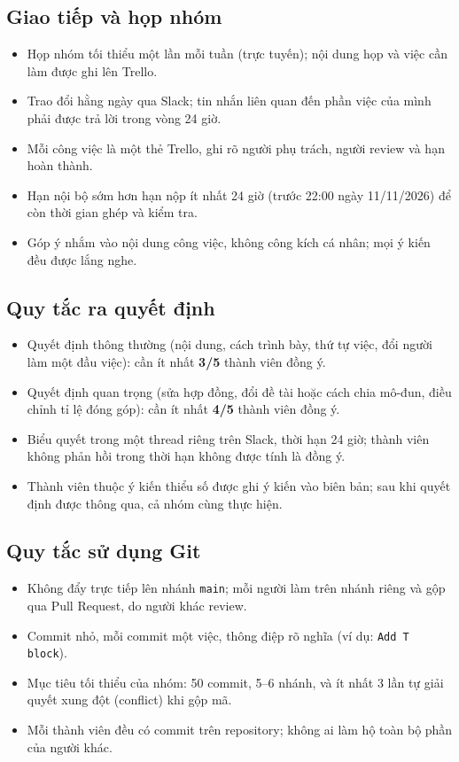 \documentclass[a4paper]{article}
\begin{document}
\subsection{Giao tiếp và họp nhóm}
\begin{itemize}
  \item Họp nhóm tối thiểu một lần mỗi tuần (trực tuyến); nội dung họp và việc cần làm được ghi lên Trello.
  \item Trao đổi hằng ngày qua Slack; tin nhắn liên quan đến phần việc của mình phải được trả lời trong vòng 24 giờ.
  \item Mỗi công việc là một thẻ Trello, ghi rõ người phụ trách, người review và hạn hoàn thành.
  \item Hạn nội bộ sớm hơn hạn nộp ít nhất 24 giờ (trước 22:00 ngày 11/11/2026) để còn thời gian ghép và kiểm tra.
  \item Góp ý nhắm vào nội dung công việc, không công kích cá nhân; mọi ý kiến đều được lắng nghe.
\end{itemize}

\subsection{Quy tắc ra quyết định}
\begin{itemize}
  \item Quyết định thông thường (nội dung, cách trình bày, thứ tự việc, đổi người làm một đầu việc): cần ít nhất \textbf{3/5} thành viên đồng ý.
  \item Quyết định quan trọng (sửa hợp đồng, đổi đề tài hoặc cách chia mô-đun, điều chỉnh tỉ lệ đóng góp): cần ít nhất \textbf{4/5} thành viên đồng ý.
  \item Biểu quyết trong một thread riêng trên Slack, thời hạn 24 giờ; thành viên không phản hồi trong thời hạn không được tính là đồng ý.
  \item Thành viên thuộc ý kiến thiểu số được ghi ý kiến vào biên bản; sau khi quyết định được thông qua, cả nhóm cùng thực hiện.
\end{itemize}

\subsection{Quy tắc sử dụng Git}
\begin{itemize}
  \item Không đẩy trực tiếp lên nhánh \texttt{main}; mỗi người làm trên nhánh riêng và gộp qua Pull Request, do người khác review.
  \item Commit nhỏ, mỗi commit một việc, thông điệp rõ nghĩa (ví dụ: \texttt{Add T block}).
  \item Mục tiêu tối thiểu của nhóm: 50 commit, 5--6 nhánh, và ít nhất 3 lần tự giải quyết xung đột (conflict) khi gộp mã.
  \item Mỗi thành viên đều có commit trên repository; không ai làm hộ toàn bộ phần của người khác.
\end{itemize}
\end{document}

